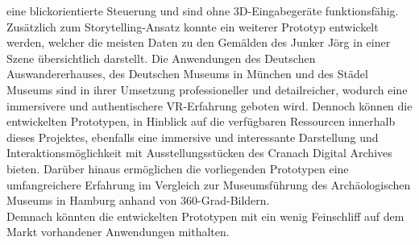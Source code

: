 \documentclass[a4paper,12pt,oneside]{article}
\begin{document}
    eine blickorientierte Steuerung und sind ohne 3D-Eingabegeräte funktionsfähig.
    Zusätzlich zum Storytelling-Ansatz konnte ein weiterer Prototyp entwickelt 
    werden, welcher die meisten Daten zu den Gemälden des
    Junker Jörg in einer Szene übersichtlich darstellt.
    Die Anwendungen des Deutschen Auswandererhauses,
    des Deutschen Museums in München und des Städel Museums sind 
    in ihrer Umsetzung professioneller und detailreicher, 
    wodurch eine immersivere und authentischere
    VR-Erfahrung geboten wird. Dennoch können die entwickelten 
    Prototypen, in Hinblick auf die verfügbaren Ressourcen 
    innerhalb dieses Projektes, ebenfalls eine
    immersive und interessante Darstellung und Interaktionsmöglichkeit mit
    Ausstellungsstücken des Cranach Digital Archives bieten.
    Darüber hinaus ermöglichen die vorliegenden Prototypen eine
    umfangreichere Erfahrung im Vergleich zur Museumsführung des
    Archäologischen Museums in Hamburg anhand von 360-Grad-Bildern. \\ 
    Demnach könnten die entwickelten Prototypen mit ein wenig 
    Feinschliff auf dem Markt vorhandener Anwendungen mithalten.
\end{document}
